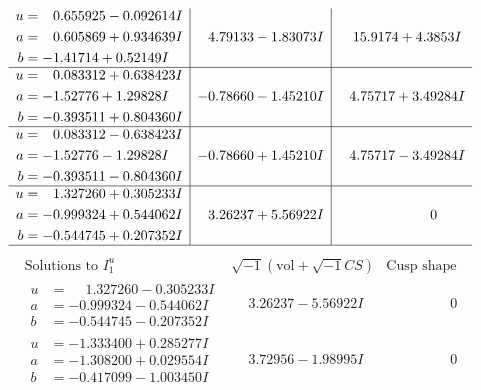 \documentclass[1p]{elsarticle_modified}
\theoremstyle{definition}
\newcommand{\I}{\sqrt{-1}}
\begin{document}
$$\begin{array}{c|c|c}
\begin{aligned}
u &= \phantom{-}0.655925 - 0.092614 I \\
a &= \phantom{-}0.605869 + 0.934639 I \\
b &= -1.41714 + 0.52149 I\end{aligned}
 & \phantom{-}4.79133 - 1.83073 I & \phantom{-}15.9174 + 4.3853 I \\ \hline\begin{aligned}
u &= \phantom{-}0.083312 + 0.638423 I \\
a &= -1.52776 + 1.29828 I \\
b &= -0.393511 + 0.804360 I\end{aligned}
 & -0.78660 - 1.45210 I & \phantom{-}4.75717 + 3.49284 I \\ \hline\begin{aligned}
u &= \phantom{-}0.083312 - 0.638423 I \\
a &= -1.52776 - 1.29828 I \\
b &= -0.393511 - 0.804360 I\end{aligned}
 & -0.78660 + 1.45210 I & \phantom{-}4.75717 - 3.49284 I \\ \hline\begin{aligned}
u &= \phantom{-}1.327260 + 0.305233 I \\
a &= -0.999324 + 0.544062 I \\
b &= -0.544745 + 0.207352 I\end{aligned}
 & \phantom{-}3.26237 + 5.56922 I & \phantom{-0.000000 } 0\\
 \hline 
 \end{array}$$\newpage$$\begin{array}{c|c|c}  
\text{Solutions to }I^u_{1}& \I (\text{vol} + \sqrt{-1}CS) & \text{Cusp shape}\\
 \hline 
\begin{aligned}
u &= \phantom{-}1.327260 - 0.305233 I \\
a &= -0.999324 - 0.544062 I \\
b &= -0.544745 - 0.207352 I\end{aligned}
 & \phantom{-}3.26237 - 5.56922 I & \phantom{-0.000000 } 0 \\ \hline\begin{aligned}
u &= -1.333400 + 0.285277 I \\
a &= -1.308200 + 0.029554 I \\
b &= -0.417099 - 1.003450 I\end{aligned}
 & \phantom{-}3.72956 - 1.98995 I & \phantom{-0.000000 } 0 \\ \hline\begin{aligned}

\end{aligned}
\end{array}$$
\end{document}
